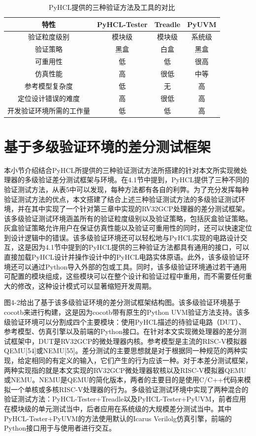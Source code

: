 \begin{table}
	\caption{PyHCL提供的三种验证方法及工具的对比}
	\centering
	\small 
	\begin{tabular}{cccc}
		\hline 
		特性 & PyHCL-Tester                & Treadle & PyUVM            \tabularnewline
		\hline 
		验证粒度级别   & 模块级		     & 模块级   & 系统级 \tabularnewline
		验证策略   & 黑盒		     & 白盒   & 黑盒 \tabularnewline
		可重用性   & 低		     & 低   & 很高 \tabularnewline
		仿真性能   & 高		     & 很低   & 中等 \tabularnewline
		参考模型复杂度   & 低		     & 无   & 高 \tabularnewline
		定位设计错误的难度   & 高		     & 很低   & 高 \tabularnewline
		开发验证环境所需的工作量   & 低		     & 低   & 高 \tabularnewline
		\hline 
	\end{tabular}
\end{table}

\section{基于多级验证环境的差分测试框架}

本小节介绍结合PyHCL所提供的三种验证测试方法所搭建的针对本文所实现微处理器的多级验证差分测试框架与环境。在4.1节中提到，PyHCL提供了三种不同的验证测试方法，从表5中可以发现，每种方法都有各自的利弊。为了充分发挥每种验证测试方法的优点，本文搭建了结合上述三种验证测试方法的多级验证测试环境，并在其中实现了一个针对第三章中实现的RV32GCP处理器的差分测试框架。该多级验证测试环境涵盖所有的验证粒度级别以及验证策略，包括灰盒验证策略。灰盒验证策略允许用户在保证仿真性能以及验证可重用性的同时，还可以快速定位到设计逻辑中的错误。该多级验证环境还可以轻松地与PyHCL实现的电路设计交互，这是因为4.1节中提到的PyHCL提供的三种验证方法都具有通用的接口，可以直接加载PyHCL设计并操作设计中的PyHCL电路实体原语。此外，该多级验证环境还可以通过Python导入外部的包或工具。同时，该多级验证环境通过若干通用可配置的模块组成，这些模块可以在整个设计和验证过程中重用，而不需要任何重大的修改，这种设计模式可以显著缩短开发周期。

图4-2给出了基于该多级验证环境的差分测试框架结构图。该多级验证环境基于cocotb来进行构建，这是因为cocotb带有原生的Python UVM验证方法支持。该多级验证环境可以分割成四个主要模块：使用PyHCL描述的待验证电路（DUT）、参考模型、仿真引擎以及前端的Python接口。在针对本文实现微处理器的差分测试框架中，DUT是RV32GCP的微处理器内核。参考模型是主流的RISC-V模拟器QEMU[54]或NEMU[55]。差分测试的主要思想就是对于根据同一种规范的两种实现，给定相同的有定义的输入，它们产生的行为应该一种。对于本差分测试框架，两种实现指的就是本文实现的RV32GCP微处理器软核以及RISC-V模拟器QEMU或NEMU。NEMU是QEMU的简化版本，两者的主要目的是使用C/C++代码来模拟一个单核或多核RISC-V处理器的行为。多级验证测试环境中实现了两种混合的验证测试方法：PyHCL-Tester+Treadle以及PyHCL-Tester+PyUVM，前者应用在模块级的单元测试当中，后者应用在系统级的大规模差分测试当中。其中PyHCL-Tester+PyUVM的方法使用默认的Icarus Verilolg仿真引擎，前端的Python接口用于与使用者进行交互。

